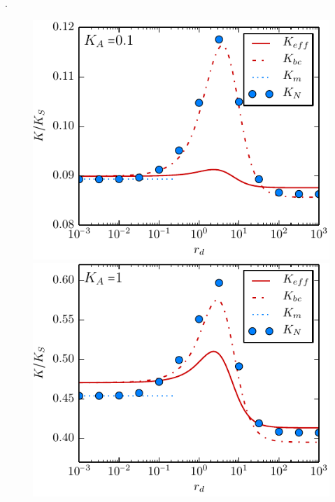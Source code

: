 .\vspace{-1.2 cm}\\
\begin{minipage}[t]{.63 \textwidth}
     \begin{figure}[H]
        \hspace{-1cm } \includegraphics[width = 1 \textwidth]{plots/rep_rate_comparison0.pdf} \\
        \hspace{-1cm } \includegraphics[width = 1 \textwidth]{plots/rep_rate_comparison1.pdf} \\

\end{figure}
\end{minipage}
